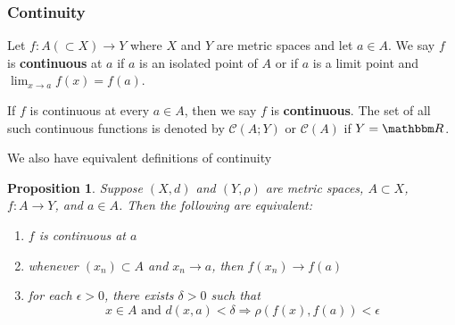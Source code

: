\documentclass[9pt,aspectratio=169]{beamer}
\newcommand{\cC}{\mathcal C}
\newcommand{\RR}{\mathbbm R}
\renewcommand{\implies}{\Rightarrow}
\newtheorem{proposition}[theorem]{Proposition}
\begin{document}
\begin{frame}[allowframebreaks]
    \frametitle{Continuity}
    \begin{definition}
        Let $f: A(\subset X) \to Y$ where $X$ and $Y$ are metric spaces and
        let $a \in A$. We say $f$ is \textbf{continuous} at $a$ if $a$ is an
        isolated point of $A$ or if $a$ is a limit point and $\lim_{x \to a}
        f(x) = f(a)$.

        If $f$ is continuous at every $a \in A$, then we say $f$ is
        \textbf{continuous}. The set of all such continuous functions is
        denoted by $\cC(A; Y)$ or $\cC(A)$ if $Y = \RR$.
    \end{definition}
    \framebreak
    We also have equivalent definitions of continuity
    \begin{proposition}
        Suppose $(X, d)$ and $(Y, \rho)$ are metric spaces, $A \subset X$,
        $f: A \to Y$, and $a \in A$. Then the following are equivalent:
        \begin{enumerate}
            \item $f$ is continuous at $a$
            \item whenever $(x_n) \subset A$ and $x_n \to a$, then $f(x_n)
            \to f(a)$
            \item for each $\epsilon > 0$, there exists $\delta > 0$ such
            that
            \begin{equation*}
                x\in A \text{ and } d(x, a) < \delta \implies \rho\left(f(x),
                f(a) \right) < \epsilon
            \end{equation*}
        \end{enumerate}
    \end{proposition}
\end{frame}
\end{document}
